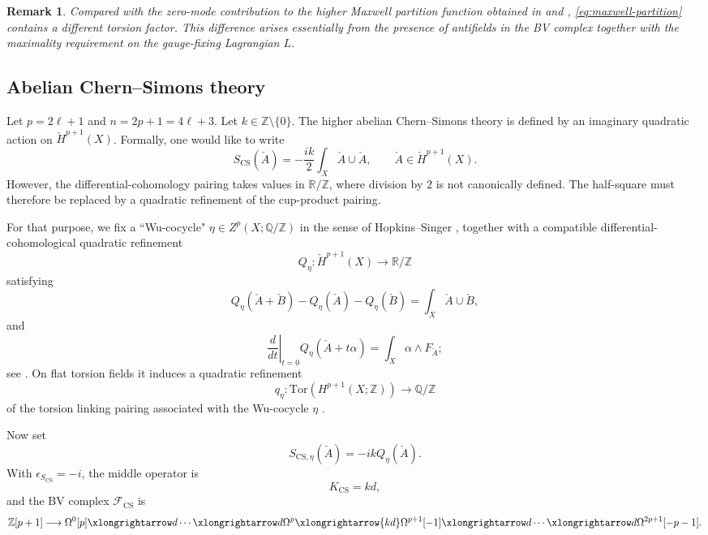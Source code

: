 \documentclass[12pt]{amsart}
\numberwithin{table}{section}
\numberwithin{equation}{section}
\newtheorem{rmk}{Remark}[section]
\theoremstyle{plain}
\newcommand{\sF}{\mathcal{F}}
\newcommand{\R}{\mathbb{R}}
\newcommand{\Z}{\mathbb{Z}}
\newcommand{\Q}{\mathbb{Q}}
\newcommand{\Tor}{\mathrm{Tor}}
\begin{document}
\begin{rmk}\label{rmk:maxwell-comparison}
	Compared with the zero-mode contribution to the higher Maxwell partition function obtained in \cite[Eq.~(22)]{DonnellyMichelWall} and \cite[Eq.~(47.21)]{MooreSaxena}, \eqref{eq:maxwell-partition} contains a different torsion factor. This difference arises essentially from the presence of antifields in the BV complex together with the maximality requirement on the gauge-fixing Lagrangian $L$.
\end{rmk}

\subsection{Abelian Chern--Simons theory}\label{sec: CS}

Let $p=2\ell+1$ and $n=2p+1=4\ell+3$. Let $k\in\Z\setminus\{0\}$. The higher abelian Chern--Simons theory is defined by an imaginary quadratic action on $\check H^{p+1}(X)$. Formally, one would like to write
\[
S_{\mathrm{CS}}(\check A)
=
-\frac{ik}{2}\int_X \check A\cup\check A,
\qquad
\check A\in\check H^{p+1}(X).
\]
However, the differential-cohomology pairing takes values in $\R/\Z$, where division by $2$ is not canonically defined. The half-square must therefore be replaced by a quadratic refinement of the cup-product pairing.

For that purpose, we fix a ``Wu-cocycle" $\eta\in Z^p(X;\Q/\Z)$ in the sense of Hopkins--Singer \cite{HopkinsSinger}, together with a compatible differential-cohomological quadratic refinement
\[
Q_\eta:\check H^{p+1}(X)\longrightarrow\R/\Z
\]
satisfying
\[
Q_\eta(\check A+\check B)-Q_\eta(\check A)-Q_\eta(\check B)
=\int_X\check A\cup\check B,
\]
and
\[
\left.\frac{d}{dt}\right|_{t=0}Q_\eta(\check A+t\alpha)
=\int_X\alpha\wedge F_{\check A};
\]
see \cite[\S4 and Appendix~A]{BelovMoore}. On flat torsion fields it induces a quadratic refinement
\[
q_\eta:\Tor \left(H^{p+1}(X;\Z)\right) \longrightarrow\Q/\Z
\]
of the torsion linking pairing associated with the Wu-cocycle $\eta$ \cite[Prop.~5.66]{HopkinsSinger}.

Now set
\[
S_{\mathrm{CS},\eta}(\check A)=-ikQ_\eta(\check A).
\]
With $\epsilon_{S_{\mathrm{CS}}}=-i$, the middle operator is
\[
K_{\mathrm{CS}}=kd,
\]
and the BV complex $\sF_{\mathrm{CS}}$ is
\begin{equation*}
\Z[p+1]\longrightarrow
\Omega^0[p]\xlongrightarrow d\cdots\xlongrightarrow d
\Omega^p\xlongrightarrow{k d}
\Omega^{p+1}[-1]\xlongrightarrow d\cdots\xlongrightarrow d
\Omega^{2p+1}[-p-1].
\end{equation*}
\end{document}
